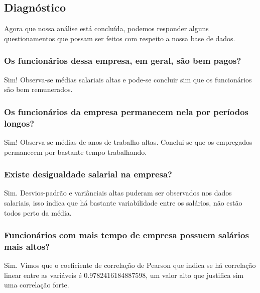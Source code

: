 \documentclass{article}
\begin{document}
\subsection{Diagnóstico}
Agora que nossa análise está concluída, podemos responder alguns questionamentos que possam ser feitos com respeito a nossa base de dados.

\subsubsection{Os funcionários dessa empresa, em geral, são bem pagos?}
Sim! Observa-se médias salariais altas e pode-se concluir sim que os funcionários são bem remunerados.

\subsubsection{Os funcionários da empresa permanecem nela por períodos longos?}
Sim! Observa-se médias de anos de trabalho altas. Conclui-se que os empregados permanecem por bastante tempo trabalhando. 

\subsubsection{Existe desigualdade salarial na empresa?}
Sim. Desvios-padrão e variânciais altas puderam ser observados nos dados salariais, isso indica que há bastante variabilidade entre os salários, não estão todos perto da média.

\subsubsection{Funcionários com mais tempo de empresa possuem salários mais altos?}
Sim. Vimos que o coeficiente de correlação de Pearson que indica se há correlação linear entre as variáveis é 0.9782416184887598, um valor alto que justifica sim uma correlação forte.  

\newpage 
\end{document}
